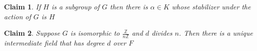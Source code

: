 \documentclass{article}
\newtheorem{claim}{Claim}
\begin{document}
\begin{claim}
  If $H$ is a subgroup of $G$ then there is $\alpha \in K$ whose stabilizer under the action of $G$ is $H$
\end{claim}

\begin{claim}
  Suppose $G$ is isomorphic to $\frac{\mathbb{Z}}{n\mathbb{Z}}$ and $d$ divides $n$. Then there is a unique intermediate field that has degree $d$ over $F$
\end{claim}
\end{document}
